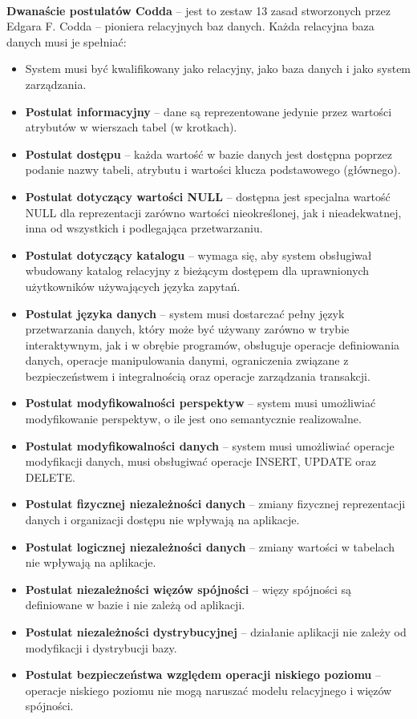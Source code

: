 \documentclass[a4paper,12pt,oneside]{book}
\begin{document}
				\noindent \\ \textbf{Dwanaście postulatów Codda} – jest to zestaw 13 zasad stworzonych przez Edgara F. Codda – pioniera relacyjnych baz danych. Każda relacyjna baza danych musi je spełniać:
				\begin{itemize}
				\itemsep 0em
					\item System musi być kwalifikowany jako relacyjny, jako baza danych i jako system zarządzania.
					\item \textbf{Postulat informacyjny} – dane są reprezentowane jedynie przez wartości atrybutów w wierszach tabel (w krotkach).
					\item \textbf{Postulat dostępu} – każda wartość w bazie danych jest dostępna poprzez podanie nazwy tabeli, atrybutu i wartości klucza podstawowego (głównego).
					\item \textbf{Postulat dotyczący wartości NULL} – dostępna jest specjalna wartość NULL dla reprezentacji zarówno wartości nieokreślonej, jak i nieadekwatnej, inna od wszystkich i podlegająca przetwarzaniu.
					\item \textbf{Postulat dotyczący katalogu} – wymaga się, aby system obsługiwał wbudowany katalog relacyjny z bieżącym dostępem dla uprawnionych użytkowników używających języka zapytań.
					\item \textbf{Postulat języka danych} – system musi dostarczać pełny język przetwarzania danych, który może być używany zarówno w trybie interaktywnym, jak i w obrębie programów, obsługuje operacje definiowania danych, operacje manipulowania danymi, ograniczenia związane z bezpieczeństwem i integralnością oraz operacje zarządzania transakcji.
					\item \textbf{Postulat modyfikowalności perspektyw} – system musi umożliwiać modyfikowanie perspektyw, o ile jest ono semantycznie realizowalne.
					\item \textbf{Postulat modyfikowalności danych} – system musi umożliwiać operacje modyfikacji danych, musi obsługiwać operacje INSERT, UPDATE oraz DELETE.
					\item \textbf{Postulat fizycznej niezależności danych} – zmiany fizycznej reprezentacji danych i organizacji dostępu nie wpływają na aplikacje.
					\item \textbf{Postulat logicznej niezależności danych} – zmiany wartości w tabelach nie wpływają na aplikacje.
					\item \textbf{Postulat niezależności więzów spójności} – więzy spójności są definiowane w bazie i nie zależą od aplikacji.
					\item\textbf{ Postulat niezależności dystrybucyjnej} – działanie aplikacji nie zależy od modyfikacji  i dystrybucji bazy.
					\item \textbf{Postulat bezpieczeństwa względem operacji niskiego poziomu} – operacje niskiego poziomu nie mogą naruszać modelu relacyjnego i więzów spójności.
				\end{itemize}
				
\end{document}
